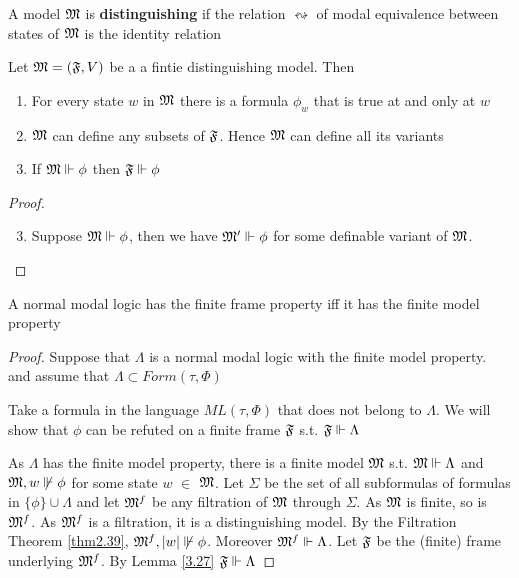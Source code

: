\documentclass[11pt]{article}
\begin{document}
\begin{definition}
A model \(\mathfrak{M}\) is \textbf{distinguishing} if the relation \(\leftrightsquigarrow\)
of modal equivalence between states of \(\mathfrak{M}\) is the identity relation
\end{definition}

\begin{lemma}[]
\label{lemma2.37}
Let \(\mathfrak{M}=(\mathfrak{F},V)\) be a a fintie distinguishing model. Then
\begin{enumerate}
\item For every state \(w\) in \(\mathfrak{M}\) there is a formula \(\phi_w\) that is
true at and only at \(w\)
\item \(\mathfrak{M}\) can define any subsets of \(\mathfrak{F}\). Hence \(\mathfrak{M}\) can define all
its variants
\item If \(\mathfrak{M}\Vdash\phi\) then \(\mathfrak{F}\Vdash\phi\)
\end{enumerate}
\end{lemma}

\begin{proof}
\begin{enumerate}
\setcounter{enumi}{2}
\item Suppose \(\mathfrak{M}\Vdash\phi\), then we have \(\mathfrak{M}'\Vdash\phi\) for some
definable variant of \(\mathfrak{M}\).
\end{enumerate}
\end{proof}

\begin{theorem}[]
A normal modal logic has the finite frame property iff it has the finite
model property
\end{theorem}


\begin{proof}
Suppose that \(\Lambda\) is a normal modal logic with the finite model property. and
assume that \(\Lambda\subset Form(\tau,\Phi)\)

Take a formula in the language \(ML(\tau,\Phi)\) that does not belong to \(\Lambda\). We
will show that \(\phi\) can be refuted on a finite frame \(\mathfrak{F}\) s.t.
\(\mathfrak{F}\Vdash\Lambda\)

As \(\Lambda\) has the finite model property, there is a finite model \(\mathfrak{M}\) s.t.
\(\mathfrak{M}\Vdash\Lambda\) and \(\mathfrak{M},w\not\Vdash\phi\) for some state \(w\) \(\in\)
\(\mathfrak{M}\). Let \(\Sigma\) be the set of all subformulas of formulas in
\(\{\phi\}\cup\Lambda\) and let \(\mathfrak{M}^f\) be any filtration of \(\mathfrak{M}\)
through \(\Sigma\). As \(\mathfrak{M}\) is finite, so is \(\mathfrak{M}^f\). As \(\mathfrak{M}^f\) is a
filtration, it is a distinguishing model. By the Filtration Theorem
\ref{thm2.39}, \(\fM^f,\abs{w}\not\Vdash\phi\). Moreover
\(\mathfrak{M}^f\Vdash\Lambda\). Let \(\mathfrak{F}\) be the (finite) frame underlying
\(\mathfrak{M}^f\). By Lemma \ref{3.27} \(\mathfrak{F}\Vdash\Lambda\)
\end{proof}
\end{document}
